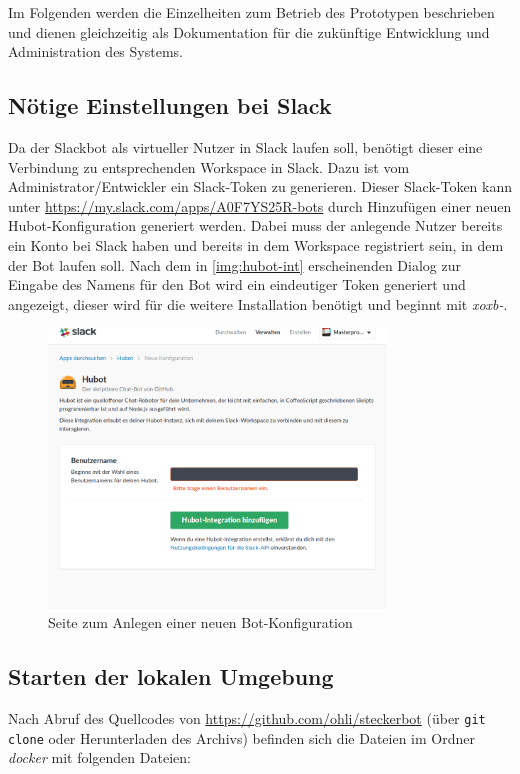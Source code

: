 Im Folgenden werden die Einzelheiten zum Betrieb des Prototypen beschrieben und dienen gleichzeitig als Dokumentation für die zukünftige Entwicklung und Administration des Systems.

\subsection{Nötige Einstellungen bei Slack}
Da der Slackbot als virtueller Nutzer in Slack laufen soll, benötigt dieser eine Verbindung zu entsprechenden Workspace in Slack. Dazu ist vom Administrator/Entwickler ein Slack-Token zu generieren.
Dieser Slack-Token kann unter \url{https://my.slack.com/apps/A0F7YS25R-bots} durch Hinzufügen einer neuen Hubot-Konfiguration generiert werden. Dabei muss der anlegende Nutzer bereits ein Konto bei Slack haben und bereits in dem Workspace registriert sein, in dem der Bot laufen soll.
Nach dem in \autoref{img:hubot-int} erscheinenden Dialog zur Eingabe des Namens für den Bot wird ein eindeutiger Token generiert und angezeigt, dieser wird für die weitere Installation benötigt und beginnt mit \textit{xoxb-}.

\begin{figure}[H]
    \centering
    \includegraphics[width=0.8\textwidth]{img/hubot-int.png}
    \caption{Seite zum Anlegen einer neuen Bot-Konfiguration}
    \label{img:hubot-int}
\end{figure}

\subsection{Starten der lokalen Umgebung}
Nach Abruf des Quellcodes von \url{https://github.com/ohli/steckerbot} (über \verb+git clone+ oder Herunterladen des Archivs) befinden sich die Dateien im Ordner \textit{docker} mit folgenden Dateien:

